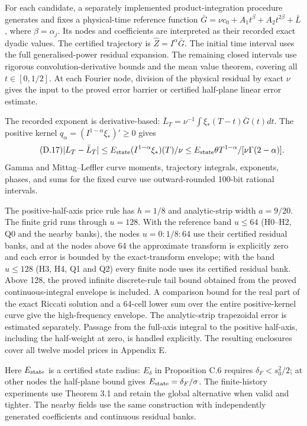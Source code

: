 \documentclass[11pt,a4paper]{article}
\begin{document}
For each candidate, a separately implemented product-integration procedure generates and fixes a physical-time reference function
\(\bar G=\nu c_0+A_1t^\beta+A_2t^{2\beta}+\bar L\), where \(\beta=\alpha_j\). Its nodes and coefficients are interpreted as their recorded exact dyadic values. The certified trajectory is \(\widehat Z=I^\alpha\bar G\). The initial time interval uses the full generalised-power residual expansion. The remaining closed intervals use rigorous convolution-derivative bounds and the mean value theorem, covering all \(t\in[0,1/2]\). At each Fourier node, division of the physical residual by exact \(\nu\) gives the input to the proved error barrier or certified half-plane linear error estimate.

The recorded exponent is derivative-based: \(\bar L_T=\nu^{-1}\int\xi_*(T-t)\bar G(t)dt\). The positive kernel \(q_\alpha=(I^{1-\alpha}\xi_*)'\ge0\) gives
\begin{equation*}\tag{D.17}
|L_T-\bar L_T|
\le E_{\rm state}(I^{1-\alpha}\xi_*)(T)/\nu
\le E_{\rm state}\theta T^{1-\alpha}/[\nu\Gamma(2-\alpha)].
\end{equation*}
Gamma and Mittag–Leffler curve moments, trajectory integrals, exponents, phases, and sums for the fixed curve use outward-rounded 100-bit rational intervals.

The positive-half-axis price rule has \(h=1/8\) and analytic-strip width \(a=9/20\). The finite grid runs through \(u=128\). With the reference band \(u\le64\) (H0–H2, Q0 and the nearby banks), the nodes \(u=0:1/8:64\) use their certified residual banks, and at the nodes above 64 the approximate transform is explicitly zero and each error is bounded by the exact-transform envelope; with the band \(u\le128\) (H3, H4, Q1 and Q2) every finite node uses its certified residual bank. Above 128, the proved infinite discrete-rule tail bound obtained from the proved continuous-integral envelope is included. A comparison bound for the real part of the exact Riccati solution and a 64-cell lower sum over the entire positive-kernel curve give the high-frequency envelope. The analytic-strip trapezoidal error is estimated separately. Passage from the full-axis integral to the positive half-axis, including the half-weight at zero, is handled explicitly. The resulting enclosures cover all twelve model prices in Appendix E.

Here \(E_{\rm state}\) is a certified state radius: \(E_\delta\) in Proposition C.6 requires \(\delta_F<s_0^2/2\); at other nodes the half-plane bound gives \(E_{\rm state}=\delta_F/\sigma\). The finite-history experiments use Theorem 3.1 and retain the global alternative when valid and tighter. The nearby fields use the same construction with independently generated coefficients and continuous residual banks.
\end{document}
